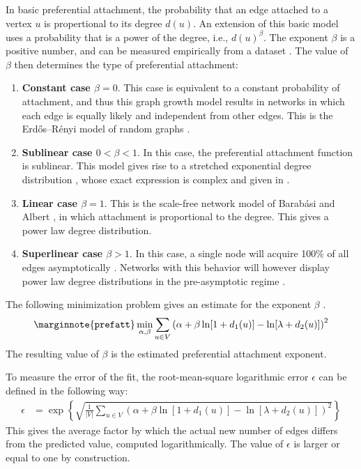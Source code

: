\documentclass{article}
\begin{document}
In basic preferential attachment, the probability that an edge
attached to a vertex $u$ is propertional to its degree $d(u)$.  An
extension of this basic model uses a probability that is a power of the
degree, i.e., $d(u)^\beta$.  The exponent $\beta$ is a positive number,
and can be measured empirically from a dataset
\citep{kunegis:preferential-attachment}.  The value of $\beta$ then
determines the type of preferential attachment:
\begin{enumerate}
\item \textbf{Constant case $\beta=0$}.  
This case is equivalent to a constant probability of attachment, 
and thus this graph growth model results in networks in which each edge
is equally likely and independent from other edges.  This is the
Erdős--Rényi model of random graphs \citep{b569}. 

\item \textbf{Sublinear case $0 < \beta < 1$}. 
In this case, the preferential attachment function is sublinear.  This
model gives rise to a stretched exponential degree distribution
\citep{b764}, whose exact 
expression is complex and given in \citep[Eq. 94]{b773}. 

\item \textbf{Linear case $\beta=1$}.
This is the scale-free network model of Barabási and Albert
\citep{b439}, in which attachment is proportional to the degree. This gives a
power law degree distribution.  

\item \textbf{Superlinear case $\beta > 1$}.
In this case, a single node will acquire 100\% of all edges
asymptotically \citep{b765}. Networks with this behavior will however display
power law degree distributions in the pre-asymptotic regime
\citep{b769}. 
\end{enumerate}

The following minimization problem gives an estimate for the exponent
$\beta$ \citep{kunegis:preferential-attachment}.
\begin{align}
  \marginnote{\texttt{prefatt}}
  \min_{\alpha,\beta} \sum_{u\in V} \left( \alpha + \beta \ln[1 + d_1(u)]
  - \ln[\lambda + d_2(u)]  \right)^2
  \label{eq:min}
\end{align}
The resulting value of $\beta$ is the estimated preferential attachment
exponent. 

To measure the error of the fit, the root-mean-square
logarithmic error $\epsilon$ can be defined in the following way: 
\begin{align*}
    \epsilon &= \exp\left\{ \sqrt{ \frac 1 {|V|} \sum_{u \in V}
      \left(\alpha + \beta \ln[1 
        + d_1(u)] - \ln[\lambda + d_2(u)]\right)^2  }  \right\}
\end{align*}
This gives the average factor by which the actual new number of edges
differs from the predicted value, computed logarithmically. 
The value of $\epsilon$ is larger or equal to one by construction. 
\end{document}
